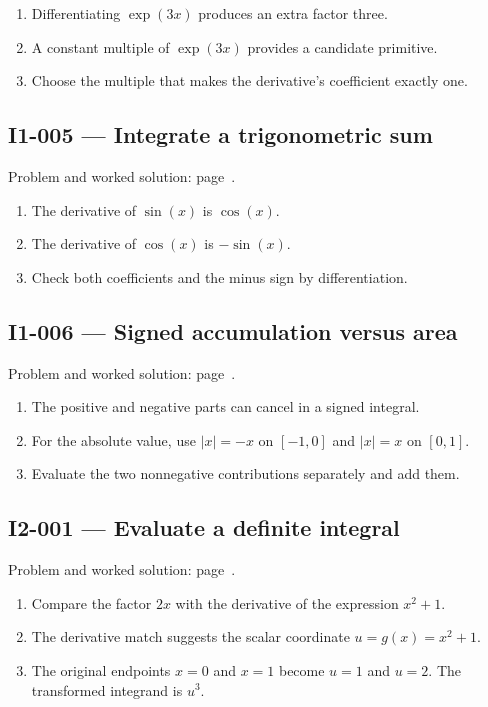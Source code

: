 \documentclass[11pt,oneside,openany]{book}
\begin{document}
\begin{enumerate}
\item Differentiating \(\exp(3x)\) produces an extra factor three.
\item A constant multiple of \(\exp(3x)\) provides a candidate primitive.
\item Choose the multiple that makes the derivative's coefficient exactly one.
\end{enumerate}
\subsection*{I1-005 --- Integrate a trigonometric sum}
\label{hints:I1-005}
Problem and worked solution: page~\pageref{problem:I1-005}.

\begin{enumerate}
\item The derivative of \(\sin(x)\) is \(\cos(x)\).
\item The derivative of \(\cos(x)\) is \(-\sin(x)\).
\item Check both coefficients and the minus sign by differentiation.
\end{enumerate}
\subsection*{I1-006 --- Signed accumulation versus area}
\label{hints:I1-006}
Problem and worked solution: page~\pageref{problem:I1-006}.

\begin{enumerate}
\item The positive and negative parts can cancel in a signed integral.
\item For the absolute value, use \(|x|=-x\) on \([-1,0]\) and \(|x|=x\) on \([0,1]\).
\item Evaluate the two nonnegative contributions separately and add them.
\end{enumerate}
\subsection*{I2-001 --- Evaluate a definite integral}
\label{hints:I2-001}
Problem and worked solution: page~\pageref{problem:I2-001}.

\begin{enumerate}
\item Compare the factor \(2x\) with the derivative of the expression \(x^2+1\).
\item The derivative match suggests the scalar coordinate \(u=g(x)=x^2+1\).
\item The original endpoints \(x=0\) and \(x=1\) become \(u=1\) and \(u=2\). The transformed integrand is \(u^3\).
\end{enumerate}
\end{document}

